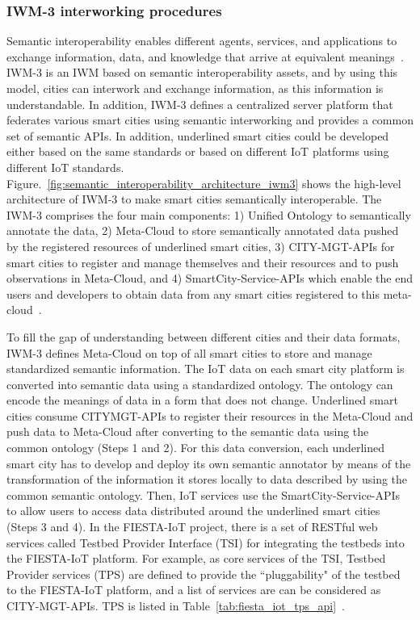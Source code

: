 \subsubsection{IWM-3 interworking procedures}
Semantic interoperability enables different agents, services, and applications to exchange information, data, and knowledge that arrive at equivalent meanings~\cite{barnaghi2012semantics, strassner2016semantic}. IWM-3 is an IWM based on semantic interoperability assets, and by using this model, cities can interwork and exchange information, as this information is understandable. In addition, IWM-3 defines a centralized server platform that federates various smart cities using semantic interworking and provides a common set of semantic APIs. In addition, underlined smart cities could be developed either based on the same standards or based on different IoT platforms using different IoT standards. Figure.~\ref{fig:semantic_interoperability_architecture_iwm3} shows the high-level architecture of IWM-3 to make smart cities semantically interoperable. The IWM-3 comprises the four main components: 1) Unified Ontology to semantically annotate the data, 2) Meta-Cloud to store semantically annotated data pushed by the registered resources of underlined smart cities, 3) CITY-MGT-APIs for smart cities to register and manage themselves and their resources and to push observations in Meta-Cloud, and 4) SmartCity-Service-APIs which enable the end users and developers to obtain data from any smart cities registered to this meta-cloud~\cite{gyrard2015unified}.



To fill the gap of understanding between different cities and their data formats, IWM-3 defines Meta-Cloud on top of all smart cities to store and manage standardized semantic information. The IoT data on each smart city platform is converted into semantic data using a standardized ontology. The ontology can encode the meanings of data in a form that does not change. Underlined smart cities consume CITYMGT-APIs to register their resources in the Meta-Cloud and push data to Meta-Cloud after converting to the semantic data using the common ontology (Steps 1 and 2). For this data conversion, each underlined smart city has to develop and deploy its own semantic annotator by means of the transformation of the information it stores locally to data described by using the common semantic ontology. Then, IoT services use the SmartCity-Service-APIs to allow users to access data distributed around the underlined smart cities (Steps 3 and 4). In the FIESTA-IoT project, there is a set of RESTful web services called Testbed Provider Interface (TSI) for integrating the testbeds into the FIESTA-IoT platform. For example, as core services of the TSI, Testbed Provider services (TPS) are defined to provide the ``pluggability" of the testbed to the FIESTA-IoT platform, and a list of services are can be considered as CITY-MGT-APIs. TPS is listed in Table~\ref{tab:fiesta_iot_tps_api}~\cite{fiesta2017architecture}. 

